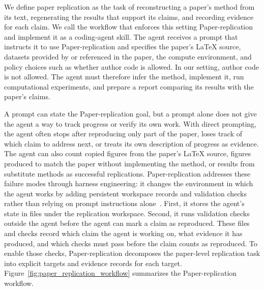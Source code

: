 \documentclass[authoryear,5p,times,nopreprintline]{elsarticle}
\begin{document}
We define paper replication as the task of reconstructing a paper's method from its text, regenerating the results that support its claims, and recording evidence for each claim.
We call the workflow that enforces this setting Paper-replication and implement it as a coding-agent skill.
The agent receives a prompt that instructs it to use Paper-replication and specifies the paper's \LaTeX{} source, datasets provided by or referenced in the paper, the compute environment, and policy choices such as whether author code is allowed.
In our setting, author code is not allowed.
The agent must therefore infer the method, implement it, run computational experiments, and prepare a report comparing its results with the paper's claims.

A prompt can state the Paper-replication goal, but a prompt alone does not give the agent a way to track progress or verify its own work.
With direct prompting, the agent often stops after reproducing only part of the paper, loses track of which claim to address next, or treats its own description of progress as evidence.
The agent can also count copied figures from the paper's \LaTeX{} source, figures produced to match the paper without implementing the method, or results from substitute methods as successful replications.
Paper-replication addresses these failure modes through harness engineering: it changes the environment in which the agent works by adding persistent workspace records and validation checks rather than relying on prompt instructions alone~\citep{lopopolo2026harness}.
First, it stores the agent's state in files under the replication workspace.
Second, it runs validation checks outside the agent before the agent can mark a claim as reproduced.
These files and checks record which claim the agent is working on, what evidence it has produced, and which checks must pass before the claim counts as reproduced.
To enable those checks, Paper-replication decomposes the paper-level replication task into explicit targets and evidence records for each target.
Figure~\ref{fig:paper_replication_workflow} summarizes the Paper-replication workflow.
\end{document}
